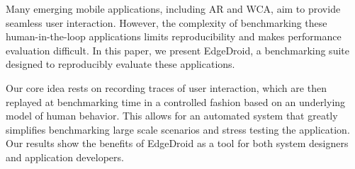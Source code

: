 
Many emerging mobile applications, including \acs{AR} and \acs{WCA}, aim to provide seamless user interaction.
However, the complexity of benchmarking these human-in-the-loop applications limits reproducibility and makes performance evaluation difficult.
In this paper, we present EdgeDroid, a benchmarking suite designed to reproducibly evaluate these applications.

Our core idea rests on recording traces of user interaction, which are then replayed at benchmarking time in a controlled fashion based on an underlying model of human behavior. 
This allows for an automated system that greatly simplifies benchmarking large scale scenarios and stress testing the application.
Our results show the benefits of EdgeDroid as a tool for both system designers and application developers.

